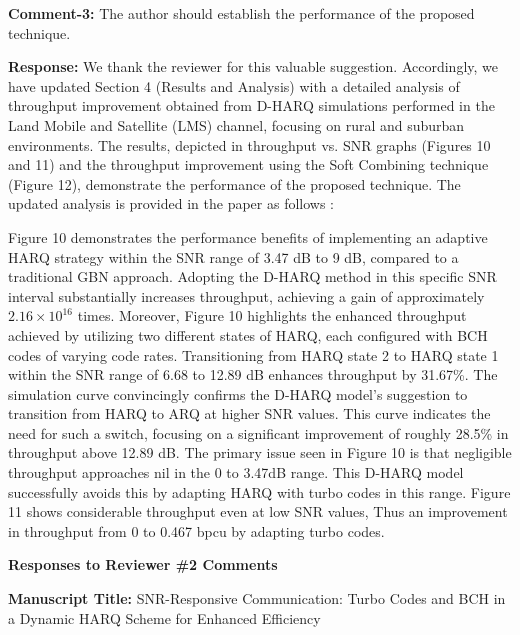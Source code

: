\documentclass[a4paper,10pt]{article}
\begin{document}
\begin{enumerate}
{\color{blue} \item \textbf{Comment-3:} The author should establish the performance of the proposed technique.} 

\textbf{Response:} We thank the reviewer for this valuable suggestion. Accordingly, we have updated Section 4 (Results and Analysis) with a detailed analysis of throughput improvement obtained from D-HARQ simulations performed in the Land Mobile and Satellite (LMS) channel, focusing on rural and suburban environments. The results, depicted in throughput vs. SNR graphs (Figures 10 and 11) and the throughput improvement using the Soft Combining technique (Figure 12), demonstrate the performance of the proposed technique. The updated analysis is provided in the paper as follows :

Figure 10 demonstrates the performance benefits of implementing an adaptive HARQ strategy within the SNR range of 3.47 dB to 9 dB, compared to a traditional GBN approach. Adopting the D-HARQ method in this specific SNR interval substantially increases throughput, achieving a gain of approximately  $2.16\times 10^{16}$ times. Moreover, Figure 10 highlights the enhanced throughput achieved by utilizing two different states of HARQ, each configured with BCH codes of varying code rates. Transitioning from HARQ state 2 to HARQ state 1 within the SNR range of 6.68 to 12.89 dB enhances throughput by 31.67\%. The simulation curve convincingly confirms the D-HARQ model's suggestion to transition from HARQ to ARQ at higher SNR values. This curve indicates the need for such a switch, focusing on a significant improvement of roughly 28.5\% in throughput above 12.89 dB. The primary issue seen in Figure 10 is that negligible throughput approaches nil in the 0 to 3.47dB range. This D-HARQ model successfully avoids this by adapting HARQ with turbo codes in this range.
Figure 11 shows considerable throughput even at low SNR values, Thus an improvement in throughput from 0 to 0.467 bpcu by adapting turbo codes. 

\end{enumerate}

\newpage


\noindent \textbf{Responses to Reviewer \#2 Comments}

\vspace{0.25in}

\noindent \textbf{Manuscript Title:} SNR-Responsive Communication: Turbo Codes and BCH in a Dynamic HARQ Scheme for Enhanced Efficiency \\
\end{document}
